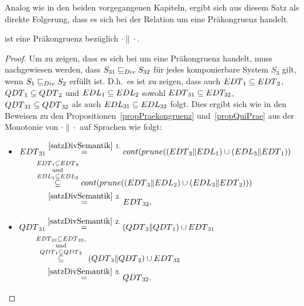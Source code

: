 Analog wie in den beiden vorgegangenen Kapiteln, ergibt sich aus diesem Satz
als direkte Folgerung, dass es sich bei der Relation \DRel{} um eine
Präkongruenz handelt.

\begin{prop}
\label{propDivPrae}
  \DRel{} ist eine Präkongruenz bezüglich $\cdot\|\cdot$.
\end{prop}

\begin{proof}
  Um zu zeigen, dass es sich bei \DRel{} um eine Präkongruenz handelt, muss
  nachgewiesen werden, dass $S_{31}\sqsubseteq _{Div}{} S_{32}$ für jedes komponierbare
  System $S_3$ gilt, wenn $S_1\sqsubseteq _{Div}{} S_2$ erfüllt ist.  D.h.\ es ist
  zu zeigen, dass auch $EDT{}_1\subseteq EDT{}_2$, $QDT{}_1\subseteq
  QDT{}_2$ und $EDL{}_1\subseteq EDL{}_2$ sowohl $EDT{}_{31}\subseteq
  EDT_{32}$, $QDT{}_{31}\subseteq QDT{}_{32}$ als auch $EDL{}_{31}\subseteq
  EDL{}_{32}$ folgt. Dies ergibt sich wie in den Beweisen zu den
  Propositionen~\ref{propPraekongruenz} und~\ref{propQuiPrae} aus der Monotonie
  von $\cdot\|\cdot$ auf Sprachen wie folgt:
  \begin{itemize}
    \item $\begin{aligned}[t]
        \EDT{}_{31} &\overset{\ref{satzDivSemantik}~1.}{=}
        \cont{}(\prune{}((\EDT{}_3\|\EDL{}_1) \cup (\EDL{}_3\|\EDT{}_1))\\
        &\hspace{-0.5cm}\overset{\EDT{}_1\subseteq
      \EDT{}_2}{\overset{\mathrm{und}}{\overset{\EDL{}_1\subseteq
    \EDL{}_2}{\subseteq}}} \cont{}(\prune{}((\EDT{}_3\|\EDL{}_2) \cup
    (\EDL{}_3\|\EDT{}_2)))\\
      &\overset{\ref{satzDivSemantik}~2.}{=} \EDT{}_{32},
    \end{aligned}$
    \item $\begin{aligned}[t]
        \QDT{}_{31} &\overset{\ref{satzDivSemantik}~2.}{=} (\QDT{}_3\|\QDT{}_1)
        \cup \EDT{}_{31}\\
        &\hspace{-0.5cm}\overset{\EDT{}_{31}\subseteq
      \EDT{}_{32},}{\overset{\mathrm{und}}{\overset{\QDT{}_1\subseteq
      \QDT{}_2}{\subseteq}}} (\QDT{}_3\|\QDT{}_2) \cup \EDT{}_{32}\\
      &\overset{\ref{satzDivSemantik}~3.}{=} \QDT{}_{32}.
    \end{aligned}$
  \end{itemize}
\end{proof}

